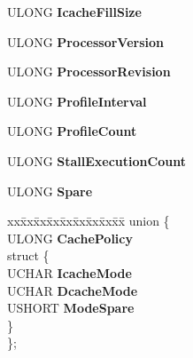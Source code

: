 \begin{DoxyCompactItemize}
\item 
\mbox{\label{struct___k_i_p_c_r_af1b414a6c788d687d5f8b6b929d172dc}} 
U\+L\+O\+NG {\bfseries Icache\+Fill\+Size}
\item 
\mbox{\label{struct___k_i_p_c_r_a981f853ceedf08e618f3a9f54359d714}} 
U\+L\+O\+NG {\bfseries Processor\+Version}
\item 
\mbox{\label{struct___k_i_p_c_r_a07c2e7dea14e2355b5cf0fe39d160552}} 
U\+L\+O\+NG {\bfseries Processor\+Revision}
\item 
\mbox{\label{struct___k_i_p_c_r_acdd474cb1f72dd53ffec708eabf13f02}} 
U\+L\+O\+NG {\bfseries Profile\+Interval}
\item 
\mbox{\label{struct___k_i_p_c_r_a272d78307a39cc5408ac442375b0c41a}} 
U\+L\+O\+NG {\bfseries Profile\+Count}
\item 
\mbox{\label{struct___k_i_p_c_r_a6f1490f8e383b59726a0afe5abfb05bd}} 
U\+L\+O\+NG {\bfseries Stall\+Execution\+Count}
\item 
\mbox{\label{struct___k_i_p_c_r_a0daeaca0f005c7431e4eab0543b98d91}} 
U\+L\+O\+NG {\bfseries Spare}
\item 
\mbox{\label{struct___k_i_p_c_r_a56b9c975b16ec2b33649e22612f6a88f}} 
\begin{tabbing}
xx\=xx\=xx\=xx\=xx\=xx\=xx\=xx\=xx\=\kill
union \{\\
\>ULONG {\bfseries CachePolicy}\\
\mbox{\label{union___k_i_p_c_r_1_1_0D2193_a3afacbd5aa14737ee3b248d5c8c9478d}} 
\>struct \{\\
\>\>UCHAR {\bfseries IcacheMode}\\
\>\>UCHAR {\bfseries DcacheMode}\\
\>\>USHORT {\bfseries ModeSpare}\\
\>\} \\
\}; \\


\end{tabbing}
\end{DoxyCompactItemize}
